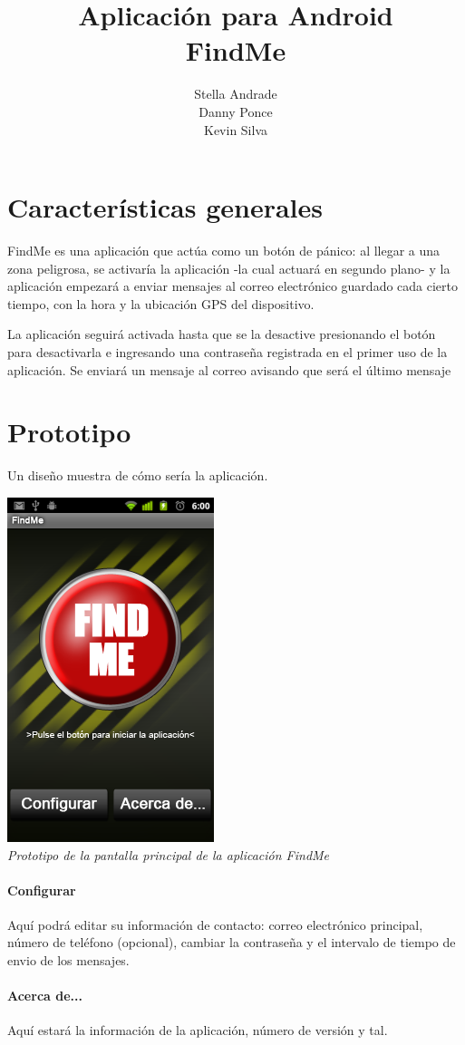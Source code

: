 \documentclass{article}
\begin{document}
\title{Aplicación para Android\\FindMe}
\author{Stella Andrade\\Danny Ponce\\Kevin Silva}
\date{}
\maketitle

\section{Características generales}
FindMe es una aplicación que actúa como un botón de pánico: al llegar a una zona peligrosa, se activaría la aplicación -la cual actuará en segundo plano- y la aplicación empezará a enviar mensajes al correo electrónico guardado cada cierto tiempo, con la hora y la ubicación GPS del dispositivo.

La aplicación seguirá activada hasta que se la desactive presionando el botón para desactivarla e ingresando una contraseña registrada en el primer uso de la aplicación. Se enviará un mensaje al correo avisando que será el último mensaje 
\newpage
\section{Prototipo}
Un diseño muestra de cómo sería la aplicación.\\
\begin{center}
\includegraphics{findmesscreenmain}\\\emph{Prototipo de la pantalla principal de la aplicación FindMe}

\paragraph{Configurar}
Aquí podrá editar su información de contacto: correo electrónico principal, número de teléfono (opcional), cambiar la contraseña y el intervalo de tiempo de envio de los mensajes.
\paragraph{Acerca de...}
Aquí estará la información de la aplicación, número de versión y tal.
\end{center}
\end{document}
